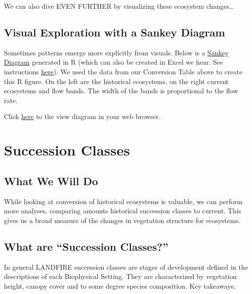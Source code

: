 \documentclass[
]{book}
\begin{document}
We can also dive EVEN FURTHER by visualizing these ecosystem changes\ldots{}

\hypertarget{visual-exploration-with-a-sankey-diagram}{%
\section{Visual Exploration with a Sankey Diagram}\label{visual-exploration-with-a-sankey-diagram}}

Sometimes patterns emerge more explicitly from visuals. Below is a \href{https://en.wikipedia.org/wiki/Sankey_diagram}{Sankey Diagram} generated in R (which can also be created in Excel we hear. See instructions \href{https://mychartguide.com/how-to-draw-sankey-diagram-in-excel/}{here}). We used the data from our Conversion Table above to create this R figure. On the left are the historical ecosystems, on the right current ecosystems and flow bands. The width of the bands is proportional to the flow rate.

Click \href{https://rswaty.github.io/landfireFSC/sankey.html}{here} to the view diagram in your web browser.

\hypertarget{successionClasses}{%
\chapter{Succession Classes}\label{successionClasses}}

\hypertarget{what-we-will-do}{%
\section{What We Will Do}\label{what-we-will-do}}

While looking at conversion of historical ecosystems is valuable, we can perform more analyses, comparing amounts historical succession classes to current. This gives us a broad measure of the changes in vegetation structure for ecosystems.

\hypertarget{what-are-succession-classes}{%
\section{What are ``Succession Classes?''}\label{what-are-succession-classes}}

In general LANDFIRE succession classes are stages of development defined in the descriptions of each Biophysical Setting. They are characterized by vegetation height, canopy cover and to some degree species composition. Key takeaways:
\end{document}
